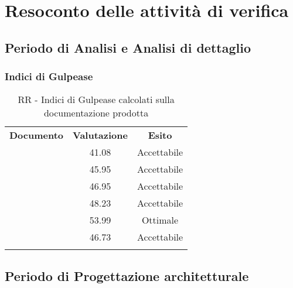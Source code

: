 \documentclass[../PianoDiQualifica.tex]{subfiles}
\begin{document}
	\section{Resoconto delle attività di verifica}
		\subsection{Periodo di Analisi e Analisi di dettaglio}
			\subsubsection{Indici di Gulpease}
			\begin{table}[H]
				\center
				\begin{tabular}{!{\VRule[1.4pt]}l!{\VRule}c!{\VRule}c!{\VRule[1.4pt]}}
					\textbf{Documento} & \textbf{Valutazione} & \textbf{Esito} \\
					\analisideirequisitiRR & 41.08 & Accettabile \\ \hline
					\glossarioRR & 45.95 & Accettabile \\ \hline
					\normediprogettoRR & 46.95 & Accettabile \\ \hline
					\pianodiprogettoRR & 48.23 & Accettabile \\ \hline
					\pianodiqualificaRR & 53.99 & Ottimale \\ \hline
					\studiodifattibilitaRR & 46.73 & Accettabile \\ \hline
				\end{tabular}
				\caption{RR - Indici di Gulpease calcolati sulla documentazione prodotta}
			\end{table}
		\subsection{Periodo di Progettazione architetturale}
			
\end{document}
